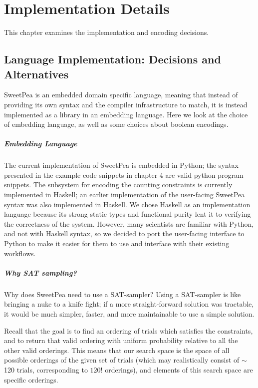 
\chapter{Implementation Details}

This chapter examines the implementation and encoding decisions.

\section{Language Implementation: Decisions and Alternatives}

SweetPea is an embedded domain specific language, meaning that instead of providing its own syntax and the compiler infrastructure to match, it is instead implemented as a library in an embedding language. Here we look at the choice of embedding language, as well as some choices about boolean encodings.

\paragraph*{Embedding Language}

The current implementation of SweetPea is embedded in Python; the syntax presented in the example code snippets in chapter 4 are valid python program snippets. The subsystem for encoding the counting constraints is currently implemented in Haskell; an earlier implementation of the user-facing SweetPea syntax was also implemented in Haskell. We chose Haskell as an implementation language because its strong static types and functional purity lent it to verifying the correctness of the system. However, many scientists are familiar with Python, and not with Haskell syntax, so we decided to port the user-facing interface to Python to make it easier for them to use and interface with their existing workflows.

\paragraph*{Why SAT sampling?}

Why does SweetPea need to use a SAT-sampler? Using a SAT-sampler is like bringing a nuke to a knife fight; if a more straight-forward solution was tractable, it would be much simpler, faster, and more maintainable to use a simple solution.

Recall that the goal is to find an ordering of trials which satisfies the constraints, and to return that valid ordering with uniform probability relative to all the other valid orderings. This means that our search space is the space of all possible orderings of the given set of trials (which may realistically consist of $\sim$120 trials, corresponding to $120!$ orderings), and elements of this search space are specific orderings.


